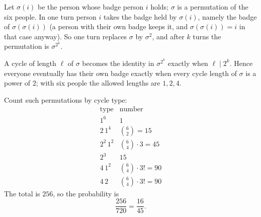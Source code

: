 Let $\sigma(i)$ be the person whose badge person $i$ holds; $\sigma$ is a permutation of the six people. In one turn person $i$ takes the badge held by $\sigma(i)$, namely the badge of $\sigma(\sigma(i))$ (a person with their own badge keeps it, and $\sigma(\sigma(i))=i$ in that case anyway). So one turn replaces $\sigma$ by $\sigma^2$, and after $k$ turns the permutation is $\sigma^{2^k}$.

A cycle of length $\ell$ of $\sigma$ becomes the identity in $\sigma^{2^k}$ exactly when $\ell\mid2^k$. Hence everyone eventually has their own badge exactly when every cycle length of $\sigma$ is a power of $2$; with six people the allowed lengths are $1,2,4$.

Count such permutations by cycle type:
\[
\begin{array}{l|c}
\text{type} & \text{number}\\\hline
1^6 & 1\\
2\,1^4 & \binom62=15\\
2^2\,1^2 & \binom64\cdot3=45\\
2^3 & 15\\
4\,1^2 & \binom64\cdot3!=90\\
4\,2 & \binom64\cdot3!=90
\end{array}
\]
The total is $256$, so the probability is
\[
\dfrac{256}{720}=\boxed{\dfrac{16}{45}}.
\]

